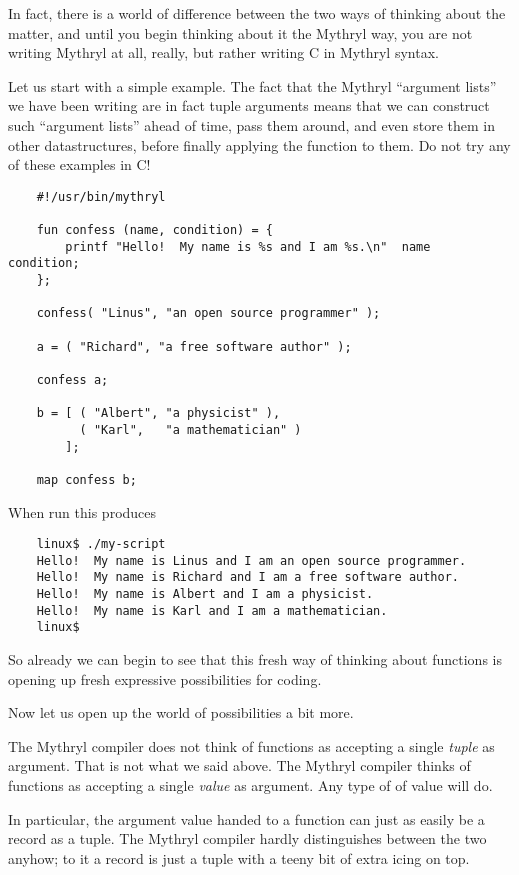 In fact, there is a world of difference between the two ways of thinking 
about the matter, and until you begin thinking about it the Mythryl way, 
you are not writing Mythryl at all, really, but rather writing C 
in Mythryl syntax.

Let us start with a simple example.  The fact that the Mythryl ``argument lists'' 
we have been writing are in fact tuple arguments means that we can construct 
such ``argument lists'' ahead of time, pass them around, and even store them 
in other datastructures, before finally applying the function to them.  Do not 
try any of these examples in C!

\begin{verbatim}
    #!/usr/bin/mythryl

    fun confess (name, condition) = {
        printf "Hello!  My name is %s and I am %s.\n"  name  condition;
    };

    confess( "Linus", "an open source programmer" );

    a = ( "Richard", "a free software author" );

    confess a;

    b = [ ( "Albert", "a physicist" ),
          ( "Karl",   "a mathematician" )
        ];

    map confess b;
\end{verbatim}

When run this produces

\begin{verbatim}
    linux$ ./my-script
    Hello!  My name is Linus and I am an open source programmer.
    Hello!  My name is Richard and I am a free software author.
    Hello!  My name is Albert and I am a physicist.
    Hello!  My name is Karl and I am a mathematician.
    linux$ 
\end{verbatim}

So already we can begin to see that this fresh way of thinking about functions 
is opening up fresh expressive possibilities for coding.

Now let us open up the world of possibilities a bit more.

The Mythryl compiler does not think of functions as accepting a single 
{\it tuple} as argument.  That is not what we said above.  The Mythryl 
compiler thinks of functions as accepting a single {\it value} as argument. 
Any type of of value will do.

In particular, the argument value handed to a function can just as easily 
be a record as a tuple.  The Mythryl compiler hardly distinguishes between 
the two anyhow;  to it a record is just a tuple with a teeny bit of extra 
icing on top.

